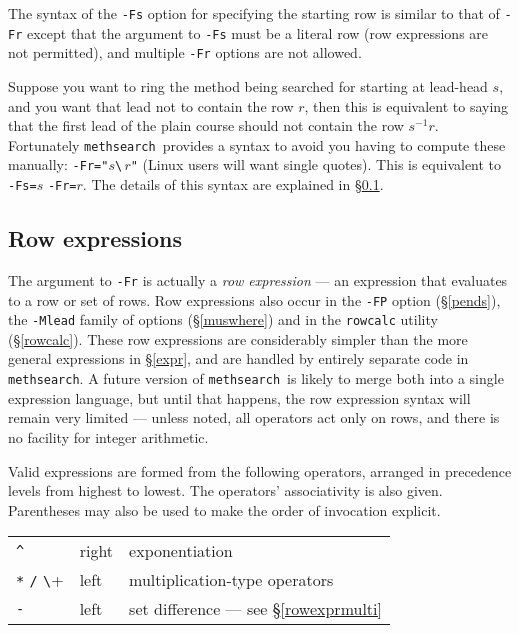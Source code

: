 \documentclass[a4paper,11pt,oneside]{book}
\makeatletter
\newcommand{\oidx}[2]{\index{#1@{\hspace*{-\optwidth}\texttt{-}#2}|ulink}}
\def\methsearch{\texttt{meth\-search}}
\newcommand{\sref}[1]{\hyperref[#1]{\S\ref{#1}}}
\makeatother
\begin{document}
The syntax of the \verb+-Fs+\oidx{Fs}{\texttt{Fs}} option for specifying
the starting row is similar to that of \verb+-Fr+ except that the
argument to \verb+-Fs+ must be a literal row (row expressions are not 
permitted), and multiple \verb+-Fr+ options are not allowed.

Suppose you want to ring the method being searched for starting at lead-head 
$s$, and you want that lead not to contain the row $r$, then this is 
equivalent to saying that the first lead of the plain course should not 
contain the row $s^{-1} r$.
Fortunately \methsearch\ provides a syntax to avoid you having to
compute these manually: \verb+-Fr="+$s$\verb+\+$\,r$\verb+"+ (Linux users
will want single quotes).  This is equivalent to \verb+-Fs=+$s$ \verb+-Fr=+$r$.
The details of this syntax are explained in \sref{rowexpr}.

\subsection{Row expressions}\label{rowexpr}

The argument to \verb+-Fr+ is actually a \textit{row expression}%
 --- an expression that evaluates 
to a row or set of rows.  Row expressions also occur in the \verb+-FP+ 
option (\sref{pends}), the \verb+-Mlead+ family of options (\sref{muswhere}) 
and in the \verb+rowcalc+ utility (\sref{rowcalc}).
These row expressions are considerably simpler than the more general 
expressions in \sref{expr}, and are handled by entirely separate code in
\methsearch.  A future version of \methsearch\ is likely to merge both
into a single expression language, but until that happens, the row expression
syntax will remain very limited --- unless noted, all operators act only on 
rows, and there is no facility for integer arithmetic.

Valid expressions are formed from the following operators, 
arranged in precedence levels from 
highest to lowest.  The operators' associativity
is also given.  Parentheses may also be used to make the order of invocation
explicit.

\begin{tabular}{l@{\quad}l@{\quad}l}
\verb+^+&                   right& exponentiation\\
\verb+*+ \verb+/+ \verb+\+& left&  multiplication-type operators\\
\verb+-+&                   left&  set difference --- see \sref{rowexprmulti}\\
\end{tabular}
\end{document}
